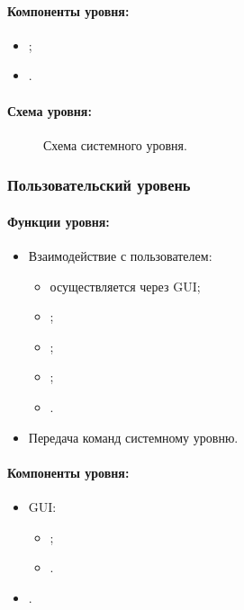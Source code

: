 \documentclass[12pt,a4paper,fullpage,titlepage]{article}
\begin{document}
\paragraph{Компоненты уровня:}
\begin{itemize}
	\item ;
	\item .\\
\end{itemize}

\paragraph{Схема уровня:}

\begin{figure}[thbp!]
	\centering

	\caption{Схема системного уровня.}
\end{figure}

\newpage
\subsubsection{Пользовательский уровень}

\paragraph{Функции уровня:}
\begin{itemize}
	\item Взаимодействие с пользователем:
	\begin{itemize}
		\item осуществляется через GUI;
		\item ;
		\item ;
		\item ;
		\item .
	\end{itemize}
	\item Передача команд системному уровню.\\
\end{itemize}

\paragraph{Компоненты уровня:}
\begin{itemize}
	\item GUI:
	\begin{itemize}
		\item ;
		\item .
	\end{itemize}
	\item .\\
\end{itemize}
\end{document}
